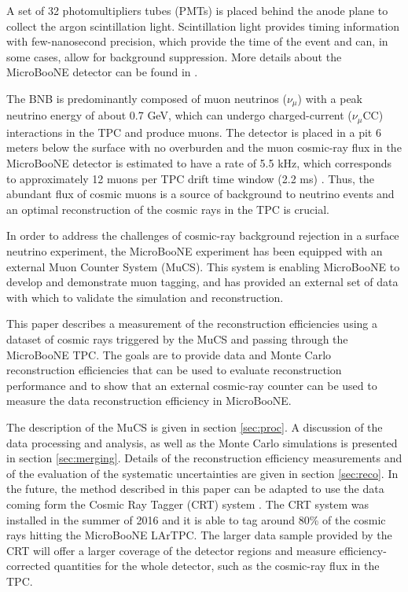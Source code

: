 \documentclass[a4paper,11pt]{article}
\begin{document}
A set of 32 photomultipliers tubes (PMTs) is placed behind the anode plane to collect the argon scintillation light. Scintillation light provides timing information with few-nanosecond precision, which provide the time of the event and can, in some cases, allow for background suppression. More details about the MicroBooNE detector can be found in \cite{detector}.

The BNB is predominantly composed of muon neutrinos ($\nu_{\mu}$) with a peak neutrino energy of about 0.7 GeV, which can undergo charged-current ($\nu_{\mu}$CC) interactions in the TPC and produce muons. The detector is placed in a pit 6 meters below the surface with no overburden and the muon cosmic-ray flux in the MicroBooNE detector is estimated to have a rate of 5.5 kHz, which corresponds to approximately 12 muons per TPC drift time window (2.2 ms) \cite{cosmic}. Thus, the abundant flux of cosmic muons is a source of background to neutrino events and an optimal reconstruction of the cosmic rays in the TPC is crucial.

In order to address the challenges of cosmic-ray background rejection in a surface neutrino experiment, the MicroBooNE experiment has been equipped with an external Muon Counter System (MuCS). This system is enabling MicroBooNE to develop and demonstrate muon tagging, and has provided an external set of data with which to validate the simulation and reconstruction.

This paper describes a measurement of the reconstruction efficiencies using a dataset of cosmic rays triggered by the MuCS and passing through the MicroBooNE TPC. The goals are to provide data and Monte Carlo reconstruction efficiencies that can be used to evaluate reconstruction performance and to show that an external cosmic-ray counter can be used to measure the data reconstruction efficiency in MicroBooNE.

The description of the MuCS is given in section \ref{sec:proc}. A discussion of the data processing and analysis, as well as the Monte Carlo simulations is presented in section \ref{sec:merging}. Details of the reconstruction efficiency measurements and of the evaluation of the systematic uncertainties are given in section \ref{sec:reco}. In the future, the method described in this paper can be adapted to use the data coming form the Cosmic Ray Tagger (CRT) system \cite{crt}. The CRT system was installed in the summer of 2016 and it is able to tag around 80\% of the cosmic rays hitting the MicroBooNE LArTPC. The larger data sample provided by the CRT will offer a larger coverage of the detector regions  and measure efficiency-corrected quantities for the whole detector, such as the cosmic-ray flux in the TPC.
\end{document}
